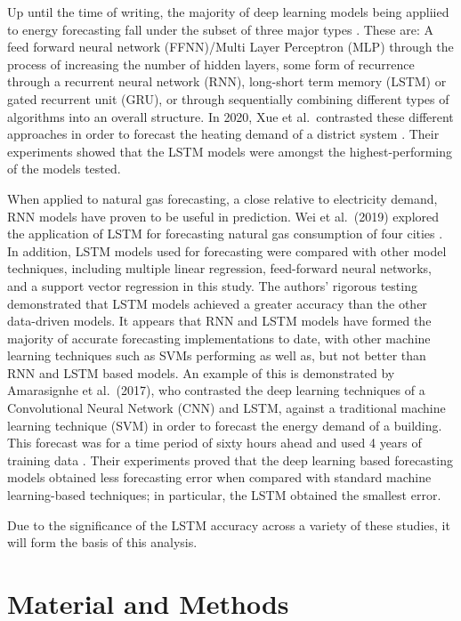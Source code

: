\documentclass[mstat,12pt]{unswthesis}
\begin{document}
\bigskip

Up until the time of writing, the majority of deep learning models being
appliied to energy forecasting fall under the subset of three major
types \cite{Kumar2013}. These are: A feed forward neural network
(FFNN)/Multi Layer Perceptron (MLP) through the process of increasing
the number of hidden layers, some form of recurrence through a recurrent
neural network (RNN), long-short term memory (LSTM) or gated recurrent
unit (GRU), or through sequentially combining different types of
algorithms into an overall structure. In 2020, Xue et al.~contrasted
these different approaches in order to forecast the heating demand of a
district system \cite{Xue2020}. Their experiments showed that the LSTM
models were amongst the highest-performing of the models tested.

\bigskip

When applied to natural gas forecasting, a close relative to electricity
demand, RNN models have proven to be useful in prediction. Wei et
al.~(2019) explored the application of LSTM for forecasting natural gas
consumption of four cities \cite{Xue2020}. In addition, LSTM models used
for forecasting were compared with other model techniques, including
multiple linear regression, feed-forward neural networks, and a support
vector regression in this study. The authors' rigorous testing
demonstrated that LSTM models achieved a greater accuracy than the other
data-driven models. It appears that RNN and LSTM models have formed the
majority of accurate forecasting implementations to date, with other
machine learning techniques such as SVMs performing as well as, but not
better than RNN and LSTM based models. An example of this is
demonstrated by Amarasignhe et al.~(2017), who contrasted the deep
learning techniques of a Convolutional Neural Network (CNN) and LSTM,
against a traditional machine learning technique (SVM) in order to
forecast the energy demand of a building. This forecast was for a time
period of sixty hours ahead and used 4 years of training data
\cite{Amarasinghe2016}. Their experiments proved that the deep learning
based forecasting models obtained less forecasting error when compared
with standard machine learning-based techniques; in particular, the LSTM
obtained the smallest error.

\bigskip

Due to the significance of the LSTM accuracy across a variety of these
studies, it will form the basis of this analysis.

\hypertarget{material-and-methods}{%
\chapter{Material and Methods}\label{material-and-methods}}
\end{document}
